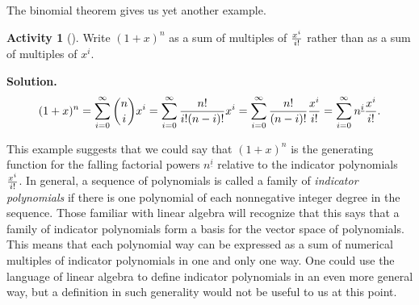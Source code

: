 \documentclass[10pt,]{book}
\theoremstyle{plain}
\theoremstyle{definition}
\newtheorem{activity}[project]{Activity}
\numberwithin{equation}{chapter}
\begin{document}
\par
The binomial theorem gives us yet another example.%
\begin{activity}[]\label{activity-76}
Write \((1+x)^n\) as a sum of multiples of \(x^i\over i!\) rather than as a sum of multiples of \(x^i\).%
\par\medskip\noindent%
\textbf{Solution.}\quad %
\begin{equation*}
(1+x)^n =
\sum_{i=0}^\infty {n\choose i}x^i=\sum_{i=0}^\infty {n!\over i!(n-i)!}x^i
=
\sum_{i=0}^\infty {n!\over (n-i)!}{x^i\over i!} = \sum_{i=0}^\infty
n^{\underline{i}} {x^i\over i!}.
\end{equation*}
\end{activity}
This example suggests that we could say that \((1+x)^n\) is the generating function for the falling factorial powers \(n^{\underline{i}}\) relative to the indicator polynomials \(x^i\over i!\). In general, a sequence of polynomials is called a family of \emph{indicator polynomials} if there is one polynomial of each nonnegative integer degree in the sequence. Those familiar with linear algebra will recognize that this says that a family of indicator polynomials form a basis for the vector space of polynomials. This means that each polynomial way can be expressed as a sum of numerical multiples of indicator polynomials in one and only one way. One could use the language of linear algebra to define indicator polynomials in an even more general way, but a definition in such generality would not be useful to us at this point.%
\typeout{************************************************}
\typeout{************************************************}
\end{document}
